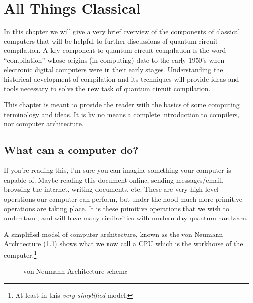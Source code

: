 \chapter{All Things Classical}\label{chap:compilers}

In this chapter we will give a very brief overview of the components of classical computers that will be helpful to further discussions of quantum circuit compilation.
A key component to quantum circuit compilation is the word ``compilation'' whose origins (in computing) date to the early 1950's when electronic digital computers were in their early stages.
Understanding the historical development of compilation and its techniques will provide ideas and tools necessary to solve the new task of quantum circuit compilation.

This chapter is meant to provide the reader with the basics of some computing terminology and ideas.
It is by no means a complete introduction to compilers, nor computer architecture.

\section{What can a computer do?}

If you're reading this, I'm sure you can imagine something your computer is capable of.
Maybe reading this document online, sending messages/email, browsing the internet, writing documents, etc.
These are very high-level operations our computer can perform, but under the hood much more primitive operations are taking place.
It is these primitive operations that we wish to understand, and will have many similarities with modern-day quantum hardware.

A simplified model of computer architecture, known as the von Neumann Architecture (\cref{fig:comparch}) shows what we now call a \ac{CPU} which is the workhorse of the computer.\footnote{At least in this \emph{very simplified} model.}

\begin{figure}[h]
    \centering
    
    \caption{von Neumann Architecture scheme}\label{fig:comparch}
\end{figure}

